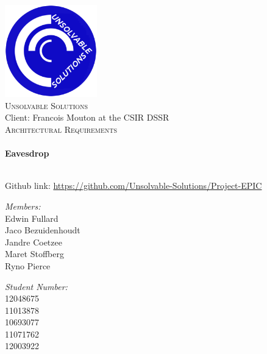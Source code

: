 
\begin{titlepage}
\begin{center}
\includegraphics[width = 0.3\textwidth]{US_newLogo.png}~\\[1cm]
\textsc{\LARGE Unsolvable Solutions}\\
Client: Francois Mouton at the CSIR DSSR\\[1.5cm]
\textsc{\Large  Architectural Requirements}\\[0.5cm]

 \HRule\\[0.4cm]
{ \huge \bfseries  Eavesdrop \\[0.4cm] }

 \HRule\\ 



Github link:  \url{https://github.com/Unsolvable-Solutions/Project-EPIC} \\[1.2cm]

\noindent
\begin{minipage}[t]{0.4\textwidth}

	\begin{flushleft} \large
	\emph{Members:}\\
		Edwin Fullard  \\
		Jaco Bezuidenhoudt \\
		Jandre Coetzee\\
		Maret Stoffberg\\
		Ryno Pierce\\
	\end{flushleft}
\end{minipage}%
\begin{minipage}[t]{0.4\textwidth}
\begin{flushright} \large
	\emph{Student Number:} \\
		12048675 \\
		11013878 \\
		 10693077 \\
		 11071762 \\
		 12003922\\
	\end{flushright}
\end{minipage}

\vfill






\end{center}
\end{titlepage}

